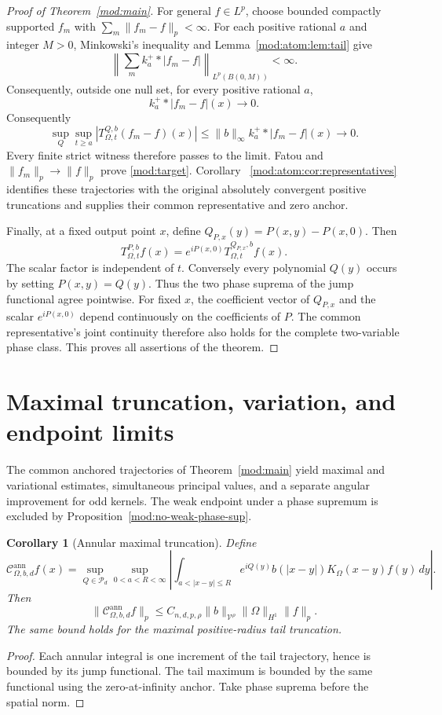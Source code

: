 \documentclass[11pt]{article}
\numberwithin{equation}{section}
\newtheorem{corollary}[theorem]{Corollary}
\theoremstyle{remark}
\theoremstyle{definition}
\newcommand{\norm}[1]{\lVert #1\rVert}
\newcommand{\PP}{\mathcal P}
\begin{document}
\begin{proof}[Proof of Theorem~\ref{mod:main}]
For general $f\in L^p$, choose bounded compactly supported $f_m$ with
$\sum_m\norm{f_m-f}_p<\infty$. For each positive rational $a$ and
integer $M>0$, Minkowski's inequality and
Lemma~\ref{mod:atom:lem:tail} give
\[
 \left\|\sum_m k_a^+*|f_m-f|\right\|_{L^p(B(0,M))}<\infty.
\]
Consequently, outside one null set, for every positive rational $a$,
\[
 k_a^+*|f_m-f|(x)\longrightarrow0.
\]
Consequently
\[
 \sup_Q\sup_{t\ge a}|T_{\Omega,t}^{Q,b}(f_m-f)(x)|
 \le\|b\|_\infty k_a^+*|f_m-f|(x)\longrightarrow0.
\]
Every finite strict witness therefore passes to the limit. Fatou and
$\norm{f_m}_p\to\norm f_p$ prove \eqref{mod:target}. Corollary~
\ref{mod:atom:cor:representatives} identifies these trajectories with the original
absolutely convergent positive truncations and supplies their common
representative and zero anchor.

Finally, at a fixed output point $x$, define
$Q_{P,x}(y)=P(x,y)-P(x,0)$. Then
\[
 T_{\Omega,t}^{P,b}f(x)=e^{iP(x,0)}T_{\Omega,t}^{Q_{P,x},b}f(x).
\]
The scalar factor is independent of $t$. Conversely every polynomial
$Q(y)$ occurs by setting $P(x,y)=Q(y)$. Thus the two phase suprema of the
jump functional agree pointwise. For fixed $x$, the coefficient
vector of $Q_{P,x}$ and the scalar $e^{iP(x,0)}$ depend continuously
on the coefficients of $P$. The common representative's joint
continuity therefore also holds for the complete two-variable phase
class. This proves all assertions of the theorem.
\end{proof}



\section{Maximal truncation, variation, and endpoint limits}\label{mod:consequences}
The common anchored trajectories of Theorem~\ref{mod:main} yield maximal
and variational estimates, simultaneous principal values, and a separate
angular improvement for odd kernels. The weak endpoint under a phase
supremum is excluded by Proposition~\ref{mod:no-weak-phase-sup}.

\begin{corollary}[Annular maximal truncation]\label{mod:annular-maximal}
Define
\[
 \mathcal C_{\Omega,b,d}^{\mathrm{ann}}f(x)=
 \sup_{Q\in\PP_d}\sup_{0<a<R<\infty}
 \left|\int_{a<|x-y|\le R}e^{iQ(y)}b(|x-y|)K_\Omega(x-y)f(y)\,dy\right|.
\]
Then
\[
 \norm{\mathcal C_{\Omega,b,d}^{\mathrm{ann}}f}_p
 \le C_{n,d,p,\rho}\|b\|_{\mathcal V^\rho}\|\Omega\|_{H^1}\norm f_p.
\]
The same bound holds for the maximal positive-radius tail truncation.
\end{corollary}
\begin{proof}
Each annular integral is one increment of the tail trajectory, hence is
bounded by its jump functional. The tail maximum is bounded by the same
functional using the zero-at-infinity anchor. Take phase suprema before
the spatial norm.
\end{proof}
\end{document}
